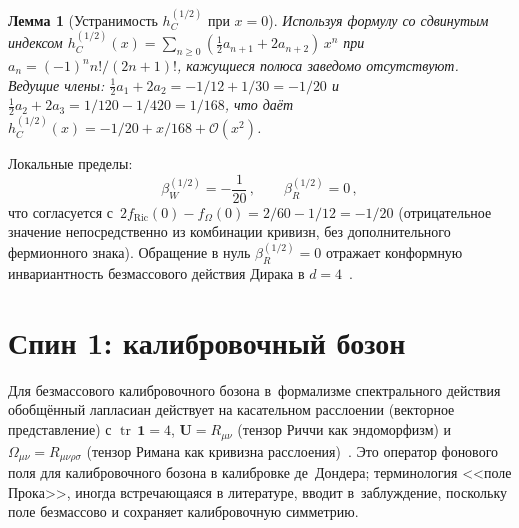 \documentclass[aps,prd,twocolumn,superscriptaddress,nofootinbib,floatfix]{revtex4-2}
\newtheorem{lemma}[theorem]{\cyrillicfont Лемма}
\theoremstyle{definition}
\theoremstyle{remark}
\newcommand{\tr}{\operatorname{tr}}
\begin{document}
\begin{lemma}[Устранимость $h_C^{(1/2)}$ при $x = 0$]
\label{lem:pole-dirac}
Используя формулу со сдвинутым индексом
$h_C^{(1/2)}(x) = \sum_{n \geq 0}(\tfrac{1}{2}a_{n+1} + 2a_{n+2})\,x^n$
при $a_n = (-1)^n n!/(2n+1)!$, кажущиеся полюса заведомо отсутствуют.
Ведущие члены: $\tfrac{1}{2}a_1 + 2a_2 = -1/12 + 1/30 = -1/20$
и $\tfrac{1}{2}a_2 + 2a_3 = 1/120 - 1/420 = 1/168$, что даёт
$h_C^{(1/2)}(x) = -1/20 + x/168 + \mathcal{O}(x^2)$.
\end{lemma}

Локальные пределы:
\begin{equation}
  \beta_W^{(1/2)} = -\frac{1}{20}\,,\qquad
  \beta_R^{(1/2)} = 0\,,
  \label{eq:beta-dirac}
\end{equation}
что согласуется с~$2f_{\text{Ric}}(0) - f_\Omega(0) = 2/60 - 1/12 = -1/20$
(отрицательное значение непосредственно из комбинации кривизн, без
дополнительного фермионного знака). Обращение в нуль
$\beta_R^{(1/2)} = 0$ отражает конформную инвариантность безмассового
действия Дирака в $d = 4$~\cite{Parker:2009uva,Codello:2008vh}.


\section{Спин 1: калибровочный бозон}
\label{sec:vector}

Для безмассового калибровочного бозона в~формализме спектрального действия
обобщённый лапласиан действует на касательном расслоении (векторное
представление) с $\tr\,\mathbf{1} = 4$, $\mathbf{U} = R_{\mu\nu}$
(тензор Риччи как эндоморфизм) и $\Omega_{\mu\nu} = R_{\mu\nu\rho\sigma}$
(тензор Римана как кривизна
расслоения)~\cite{Parker:2009uva,Vassilevich:2003xt}. Это оператор
фонового поля для калибровочного бозона в калибровке де~Дондера;
терминология <<поле Прока>>, иногда встречающаяся в литературе, вводит
в~заблуждение, поскольку поле безмассово и сохраняет калибровочную
симметрию.
\end{document}
